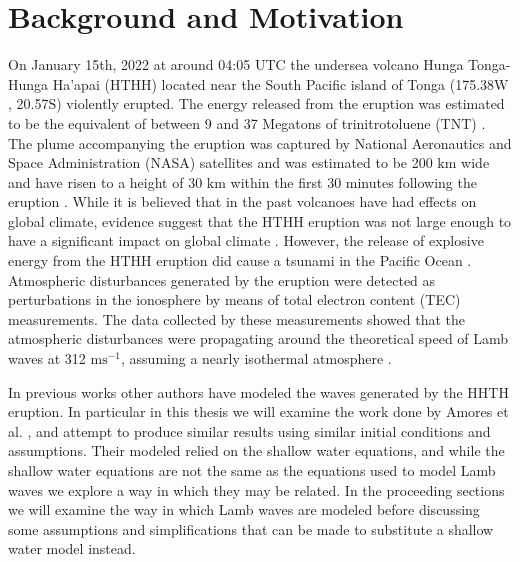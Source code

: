 \documentclass[twoside]{bsu-ms}
\begin{document}
% 

%
%
\chapter{Background and Motivation}\label{ch:1}


On January 15th, 2022 at around 04:05 $\mathrm{UTC}$ the undersea volcano Hunga Tonga-Hunga Ha’apai (HTHH) located near the South Pacific island of Tonga (175.38\textdegree $\mathrm{W}$, 20.57\textdegree $\mathrm{S}$) violently erupted. The energy released from the eruption was estimated to be the equivalent of between 9 and 37 Megatons of trinitrotoluene (TNT) \cite{Astafyeva}. The plume accompanying the eruption was captured by National Aeronautics and Space Administration (NASA) satellites \cite{NASA} and  was estimated to be 200 $\mathrm{km}$ wide and have risen to a height of 30 $\mathrm{km}$ within the first 30 minutes following the eruption \cite{carr2022stereo}. While it is believed that in the past volcanoes have had effects on global climate, evidence suggest that the HTHH eruption was not large enough to have a significant impact on global climate \cite{Zuo}. However, the release of explosive energy from the HTHH eruption did cause a tsunami in the Pacific Ocean \cite{kubota2022global}. Atmospheric disturbances generated by the eruption were detected as perturbations in the ionosphere by means of total electron content (TEC) measurements. The data collected by these measurements \cite{heki2022ionospheric, hong, wright2022surface} showed that the atmospheric disturbances were propagating around the theoretical speed of Lamb waves at 312 $\mathrm{ms}^{-1}$,  assuming a nearly isothermal atmosphere \cite{bretherton1969lamb}.

In previous works other authors have modeled the waves generated by the HHTH eruption. In particular in this thesis we will examine the work done by Amores et al. \cite{amores2022numerical}, and attempt to produce similar results using similar initial conditions and assumptions. Their modeled relied on the shallow water equations, and while the shallow water equations are not the same as the equations used to model Lamb waves we explore a way in which they may be related. In the proceeding sections we will examine the way in which Lamb waves are modeled before discussing some assumptions and simplifications that can be made to substitute a shallow water model instead.
\end{document}
